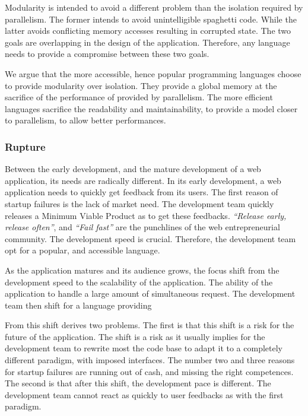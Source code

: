 Modularity is intended to avoid a different problem than the isolation required by parallelism.
The former intends to avoid unintelligible spaghetti code.
While the latter avoids conflicting memory accesses resulting in corrupted state.
The two goals are overlapping in the design of the application.
Therefore, any language needs to provide a compromise between these two goals.

We argue that the more accessible, hence popular programming languages choose to provide modularity over isolation.
They provide a global memory at the sacrifice of the performance of provided by parallelism.
The more efficient languages sacrifice the readability and maintainability, to provide a model closer to parallelism, to allow better performances.

\subsubsection{Rupture}

Between the early development, and the mature development of a web application, its needs are radically different.
In its early development, a web application needs to quickly get feedback from its users.
The first reason of startup failures is the lack of market need.
The development team quickly releases a Minimum Viable Product as to get these feedbacks.
\textit{``Release early, release often''}, and \textit{``Fail fast''} are the punchlines of the web entrepreneurial community.
The development speed is crucial.
Therefore, the development team opt for a popular, and accessible language.

As the application matures and its audience grows, the focus shift from the development speed to the scalability of the application.
The ability of the application to handle a large amount of simultaneous request.
The development team then shift for a language providing 

From this shift derives two problems.
The first is that this shift is a risk for the future of the application.
The shift is a risk as it usually implies for the development team to rewrite most the code base to adapt it to a completely different paradigm, with imposed interfaces.
The number two and three reasons for startup failures are running out of cash, and missing the right competences.
The second is that after this shift, the development pace is different.
The development team cannot react as quickly to user feedbacks as with the first paradigm.

